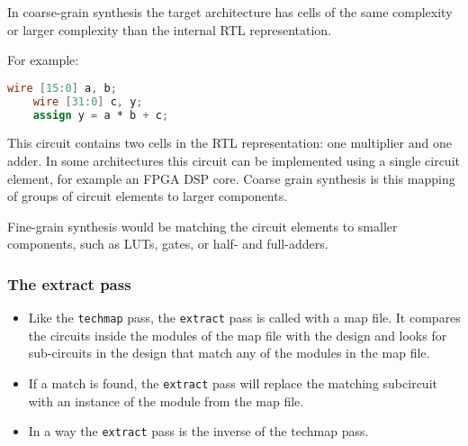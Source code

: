 \begin{frame}[fragile]{\subsubsecname}
In coarse-grain synthesis the target architecture has cells of the same
complexity or larger complexity than the internal RTL representation.

For example:
\begin{lstlisting}[xleftmargin=0.5cm, basicstyle=\ttfamily\fontsize{8pt}{10pt}\selectfont, language=verilog]
	wire [15:0] a, b;
	wire [31:0] c, y;
	assign y = a * b + c;
\end{lstlisting}

This circuit contains two cells in the RTL representation: one multiplier and
one adder. In some architectures this circuit can be implemented using
a single circuit element, for example an FPGA DSP core. Coarse grain synthesis
is this mapping of groups of circuit elements to larger components.

\bigskip
Fine-grain synthesis would be matching the circuit elements to smaller
components, such as LUTs, gates, or half- and full-adders.
\end{frame}

\subsubsection{The extract pass}

\begin{frame}{\subsubsecname}
\begin{itemize}
\item Like the {\tt techmap} pass, the {\tt extract} pass is called with
a map file. It compares the circuits inside the modules of the map file
with the design and looks for sub-circuits in the design that match any
of the modules in the map file.
\bigskip
\item If a match is found, the {\tt extract} pass will replace the matching
subcircuit with an instance of the module from the map file.
\bigskip
\item In a way the {\tt extract} pass is the inverse of the techmap pass.
\end{itemize}
\end{frame}

